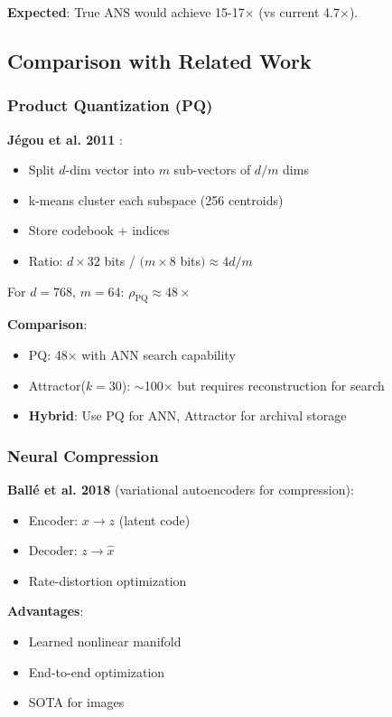 \documentclass[11pt,a4paper]{article}
\begin{document}
\textbf{Expected}: True ANS would achieve 15-17$\times$ (vs current 4.7$\times$).

\subsection{Comparison with Related Work}

\subsubsection{Product Quantization (PQ)}

\textbf{J\'egou et al. 2011} \cite{jegou2011product}:
\begin{itemize}
\item Split $d$-dim vector into $m$ sub-vectors of $d/m$ dims
\item k-means cluster each subspace (256 centroids)
\item Store codebook + indices
\item Ratio: $d \times 32$ bits / $(m \times 8$ bits$) \approx 4d/m$
\end{itemize}

For $d=768$, $m=64$: $\rho_{\text{PQ}} \approx 48\times$

\textbf{Comparison}:
\begin{itemize}
\item PQ: 48$\times$ with ANN search capability
\item Attractor($k=30$): $\sim$100$\times$ but requires reconstruction for search
\item \textbf{Hybrid}: Use PQ for ANN, Attractor for archival storage
\end{itemize}

\subsubsection{Neural Compression}

\textbf{Ball\'e et al. 2018} \cite{balle2018variational} (variational autoencoders for compression):
\begin{itemize}
\item Encoder: $x \to z$ (latent code)
\item Decoder: $z \to \hat{x}$
\item Rate-distortion optimization
\end{itemize}

\textbf{Advantages}:
\begin{itemize}
\item Learned nonlinear manifold
\item End-to-end optimization
\item SOTA for images
\end{itemize}
\end{document}
